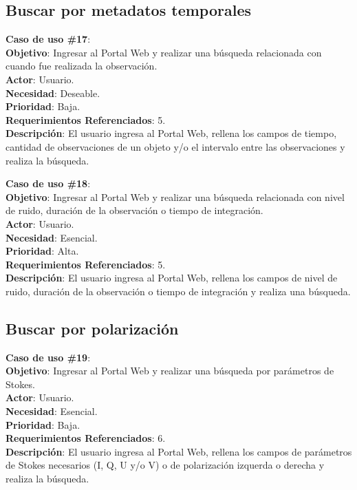 \subsection{Buscar por metadatos temporales}
\noindent\textbf{Caso de uso \#17}: \\
\noindent\textbf{Objetivo}: Ingresar al Portal Web y realizar una búsqueda relacionada con cuando fue realizada la observación. \\
\textbf{Actor}: Usuario.\\
\textbf{Necesidad}: Deseable.\\
\textbf{Prioridad}: Baja.\\
\textbf{Requerimientos Referenciados}: 5. \\
\textbf{Descripción}: El usuario ingresa al Portal Web, rellena los campos de tiempo, cantidad de observaciones de un objeto y/o el intervalo entre las observaciones y realiza la búsqueda.
\vspace{1.0cm}

\noindent\textbf{Caso de uso \#18}: \\
\noindent\textbf{Objetivo}: Ingresar al Portal Web y realizar una búsqueda relacionada con nivel de ruido, duración de la observación o tiempo de integración.\\
\textbf{Actor}: Usuario.\\
\textbf{Necesidad}: Esencial.\\
\textbf{Prioridad}: Alta.\\
\textbf{Requerimientos Referenciados}: 5. \\
\textbf{Descripción}: El usuario ingresa al Portal Web, rellena los campos de nivel de ruido, duración de la observación o tiempo de integración y realiza una búsqueda.
\vspace{1.0cm}

\subsection{Buscar por polarización}
\noindent\textbf{Caso de uso \#19}: \\
\noindent\textbf{Objetivo}: Ingresar al Portal Web y realizar una búsqueda por parámetros de Stokes. \\
\textbf{Actor}: Usuario.\\
\textbf{Necesidad}: Esencial.\\
\textbf{Prioridad}: Baja.\\
\textbf{Requerimientos Referenciados}: 6. \\
\textbf{Descripción}: El usuario ingresa al Portal Web, rellena los campos de parámetros de Stokes necesarios (I, Q, U y/o V) o de polarización izquerda o derecha y realiza la búsqueda.
\vspace{1.0cm}

